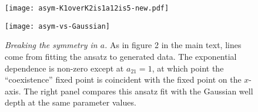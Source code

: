 \iffalse
\begin{figure}[ht]
	\centering
	\begin{minipage}{0.49\linewidth}
		\centering
		\texttt{[image: asym-K1overK2is1a12is5-new.pdf]}
	\end{minipage}
	\begin{minipage}{0.49\linewidth}
		\centering
		\texttt{[image: asym-vs-Gaussian]}
	\end{minipage}
	\centering
	\caption{\emph{Breaking the symmetry in $a$.} As in figure 2 in the main text, lines come from fitting the ansatz to generated data. The exponential dependence is non-zero except at $a_{21}=1$, at which point the ``coexistence'' fixed point is coincident with the fixed point on the $x$-axis. The right panel compares this ansatz fit with the Gaussian well depth at the same parameter values. } %
	\label{asymmetrica}
\end{figure}%

